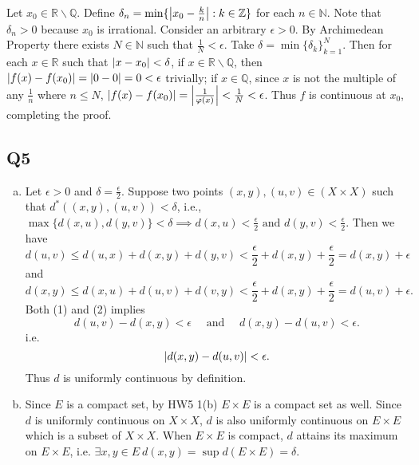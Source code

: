 \documentclass[12pt,lettersize]{article}
\newcommand{\R}{\mathbb{R}}
\newcommand{\Q}{\mathbb{Q}}
\newcommand{\N}{\mathbb{N}}
\newcommand{\Z}{\mathbb{Z}}
\begin{document}
	Let $x_0\in\R\backslash\Q$. Define $\delta_n=\min\{\abs{x_0-\frac{k}{n}}: k\in\Z\}$ for each $n\in\N$. Note that $\delta_n>0$ because $x_0$ is irrational. Consider an arbitrary $\epsilon>0$. By Archimedean Property there exists $N\in\N$ such that $\frac{1}{N}<\epsilon$. Take $\delta=\min\{\delta_k\}_{k=1}^{N}$. Then for each $x\in\R$ such that $\abs{x-x_0}<\delta$, if $x\in\R\backslash\Q$, then $\abs{f(x)-f(x_0)}=\abs{0-0}=0<\epsilon$ trivially; if $x\in\Q$, since $x$ is not the multiple of any $\frac{1}{n}$ where $n\leq N$, $\abs{f(x)-f(x_0)}=\abs{\frac{1}{\varphi(x)}}<\frac{1}{N}<\epsilon$. Thus $f$ is continuous at $x_0$, completing the proof.
	\newpage
	
	\subsection*{Q5}
	\begin{enumerate}[(a)]
		\item Let $\epsilon>0$ and $\delta=\frac{\epsilon}{2}$. Suppose two points $(x,y),(u,v)\in(X\times X)$ such that $d^\ast((x,y),(u,v))<\delta$, i.e., $\max\{d(x,u),d(y,v)\}<\delta\implies d(x,u)<\frac{\epsilon}{2}\text{ and }d(y,v)<\frac{\epsilon}{2}$. Then we have
		\begin{equation}
			d(u,v)\leq d(u,x)+d(x,y)+d(y,v)<\frac{\epsilon}{2}+d(x,y)+\frac{\epsilon}{2}=d(x,y)+\epsilon
		\end{equation}
		and
		\begin{equation}
			d(x,y)\leq d(x,u)+d(u,v)+d(v,y)<\frac{\epsilon}{2}+d(x,y)+\frac{\epsilon}{2}=d(u,v)+\epsilon.
		\end{equation}
		Both (1) and (2) implies
		\begin{displaymath}
			d(u,v)-d(x,y)<\epsilon\quad\text{ and }\quad d(x,y)-d(u,v)<\epsilon.
		\end{displaymath}
		i.e.
		\begin{displaymath}
			\abs{d(x,y)-d(u,v)}<\epsilon.
		\end{displaymath}
		Thus $d$ is uniformly continuous by definition.
		\item Since $E$ is a compact set, by HW5 1(b) $E\times E$ is a compact set as well. Since $d$ is uniformly continuous on $X\times X$, $d$ is also uniformly continuous on $E\times E$ which is a subset of $X\times X$. When $E\times E$ is compact, $d$ attains its maximum on $E\times E$, i.e. $\exists x,y\in E\ d(x,y)=\sup d(E\times E)=\delta$. 
	\end{enumerate}
	\newpage
	
\end{document}
